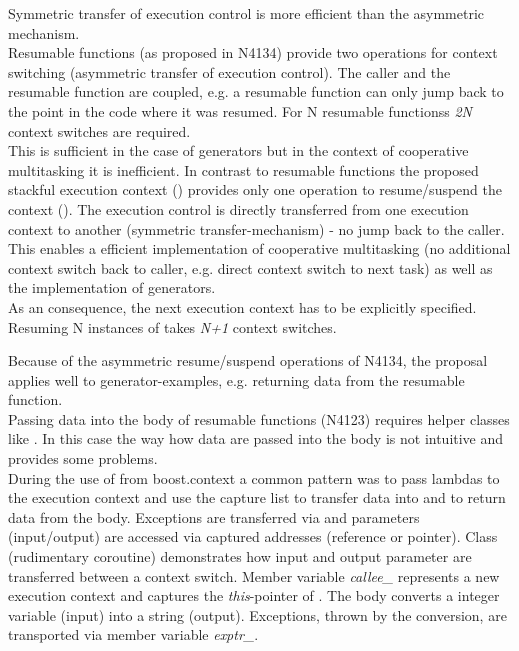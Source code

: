 Symmetric transfer of execution control is more efficient than the asymmetric
mechanism.\\
\newline
Resumable functions (as proposed in N4134) provide two operations for context
switching (asymmetric transfer of execution control). The caller and the
resumable function are coupled, e.g. a resumable function can only jump back to
the point in the code where it was resumed.
For N resumable functionss \emph{2N} context switches are required.\\
\newline
This is sufficient in the case of generators but in the context of cooperative
multitasking it is inefficient.
In contrast to resumable functions the proposed stackful execution context
(\ectx) provides only one operation to resume/suspend the context (\ectxop). The
execution control is directly transferred from one execution context to another
(symmetric transfer-mechanism) - no jump back to the caller. This enables a
efficient implementation of cooperative multitasking (no additional context
switch back to caller, e.g. direct context switch to next task) as well as the
implementation of generators.\\
As an consequence, the next execution context has to be explicitly specified.\\
\newline
{}
Resuming N instances of \ectx takes \emph{N+1} context switches.

Because of the asymmetric resume/suspend operations of N4134, the proposal
applies well to generator-examples, e.g. returning data from the resumable
function.\\
\newline
Passing data into the body of resumable functions (N4123) requires helper
classes like \channel.
In this case the way how data are passed into the body is not intuitive and
provides some problems.\\
\newline
During the use of  from boost.context\cite{bcontext} a
common pattern was to pass lambdas to the execution context and use the capture
list to transfer data into and to return data from the body. Exceptions are
transferred via \excpt and parameters (input/output) are accessed
via captured addresses (reference or pointer).
Class  (rudimentary coroutine) demonstrates how input and output
parameter are transferred between a context switch. Member variable
\emph{callee\_} represents a new execution context and captures the
\emph{this}-pointer of . The body converts a integer variable (input)
into a string (output). Exceptions, thrown by the conversion, are transported
via member variable \emph{exptr\_}.

